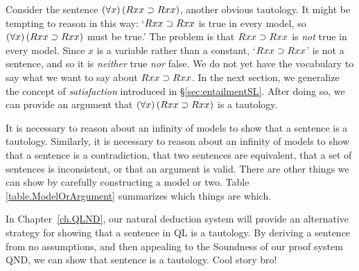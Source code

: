 

Consider the sentence $(\forall x) \,(Rxx\supset Rxx)$, another obvious tautology. It might be tempting to reason in this way: `$Rxx\supset Rxx$ is true in every model, so $(\forall x) \,(Rxx\supset Rxx)$ must be true.' The problem is that $Rxx\supset Rxx$ is \emph{not} true in every model. Since $x$ is a variable rather than a constant, `$Rxx\supset Rxx$' is not a sentence, and so it is \emph{neither} true \emph{nor} false. We do not yet have the vocabulary to say what we want to say about $Rxx\supset Rxx$. In the next section, we generalize the concept of \emph{satisfaction} introduced in \S\ref{sec:entailmentSL}. After doing so, we can provide an argument that $(\forall x) \,(Rxx\supset Rxx)$ is a tautology.

It is necessary to reason about an infinity of models to show that a sentence is a tautology. Similarly, it is necessary to reason about an infinity of models to show that a sentence is a contradiction, that two sentences are equivalent, that a set of sentences is inconsistent, or that an argument is valid. There are other things we can show by carefully constructing a model or two. Table \ref{table.ModelOrArgument} summarizes which things are which.

{\color{black}In Chapter~\ref{ch.QLND}, our natural deduction system will provide an alternative strategy for showing that a sentence in QL is a tautology. By deriving a sentence from no assumptions, and then appealing to the Soundness of our proof system QND, we can show that sentence is a tautology. Cool story bro!}

